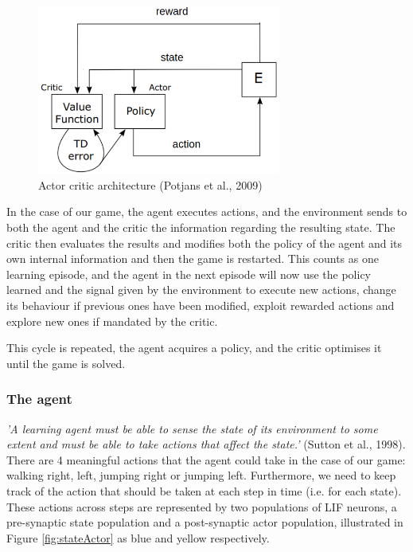 \documentclass[10pt]{article}
\begin{document}
    \begin{figure}[ht!]
    \centering
    \includegraphics[width=80mm]{./actorCriticDiagram.png}
    \caption{Actor critic architecture (Potjans et al., 2009)}
    \label{fig:potjansArchitecture}
    \end{figure}

    In the case of our game, the agent executes actions, and the environment sends to both the agent and the critic the information regarding the resulting state. The critic then evaluates the results and modifies both the policy of the agent and its own internal information and then the game is restarted. This counts as one learning episode, and the agent in the next episode will now use the policy learned and the signal given by the environment to execute new actions, change its behaviour if previous ones have been modified, exploit rewarded actions and explore new ones if mandated by the critic. 
    
    This cycle is repeated, the agent acquires a policy, and the critic optimises it until the game is solved.

    \subsubsection{The agent}

    \textit{'A learning agent must be able to sense the state of its environment to some extent and must be able to take actions that affect the state.'} (Sutton et al., 1998). There are 4 meaningful actions that the agent could take in the case of our game: walking right, left, jumping right or jumping left. Furthermore, we need to keep track of the action that should be taken at each step in time (i.e. for each state). These actions across steps are represented by two populations of LIF neurons, a pre-synaptic state population and a post-synaptic actor population, illustrated in Figure \ref{fig:stateActor} as blue and yellow respectively.
    
\end{document}
